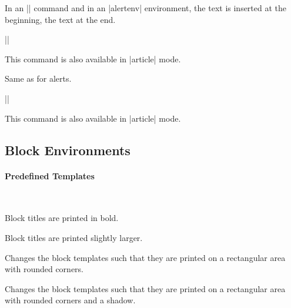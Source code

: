 \begin{command}{\usealerttemplate{}}
  In an |\alert| command and in an |alertenv| environment, the text
   is inserted at the beginning, the text
   at the end.
  
  \example |\usealerttemplate{\color{red}}{}|

  \articlenote
  This command is also available in |article| mode.
\end{command}

\begin{command}{\usestructuretemplate{}}
  Same as for alerts.
  
  \example |\usestructuretemplate{\color{blue}}{}|

  \articlenote
  This command is also available in |article| mode.
\end{command}




\subsection{Block Environments}

\paragraph{Predefined Templates}\

\begin{command}{\beamertemplateboldblocks}
  Block titles are printed in bold.
\end{command}

\begin{command}{\beamertemplatelargeblocks}
  Block titles are printed slightly larger.
\end{command}

\begin{command}{\beamertemplateroundedblocks}
  Changes the block templates such that they are printed on a
  rectangular area with rounded corners.
\end{command}

\begin{command}{\beamertemplateshadowblocks}
  Changes the block templates such that they are printed on a
  rectangular area with rounded corners and a shadow.
\end{command}



